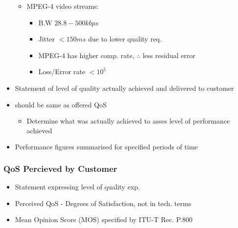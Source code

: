 \begin{itemize}
\begin{itemize}
\begin{itemize}
		\end{itemize}
		\item MPEG-4 video streams:
		\begin{itemize}
			\item B.W $28.8-500kbps$
			\item Jitter $<150ms$ due to lower quality req.
			\item MPEG-4 has higher comp. rate, $\therefore$ less
				residual error
			\item Loss/Error rate $<10^5$
		\end{itemize}
	\end{itemize}
	\item Statement of level of quality actually achieved and delivered to
		customer
	\item should be same as offered QoS
	\begin{itemize}
		\item Determine what was actually achieved to asses level of
			performance achieved
	\end{itemize}
	\item Performance figures summarised for specified periods of time
\end{itemize}
\subsubsection{QoS Percieved by Customer}
\begin{itemize}
	\item Statement expressing level of quality exp.
	\item Perceived QoS - Degrees of Satisfaction, not in tech. terms
	\item Mean Opinion Score (MOS) specified by ITU-T Rec. P.800
\end{itemize}
